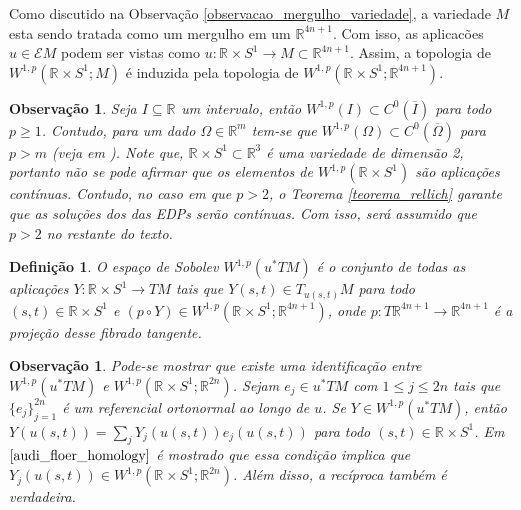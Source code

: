 \documentclass[12pt]{book}
\newtheorem{definicao}[teorema]{Definição}
\newtheorem{observacao}[teorema]{Observação}
\newcommand{\circulo}{S^{1}}
\newcommand{\energiafinitaM}{\mathcal{E}M}
\newcommand{\espacosobolev}[1]{W^{1,p}(#1)}
\newcommand{\espacosobolevcontradominio}[2]{W^{1,p}(#1;#2)}
\newcommand{\espacotangenteponto}[2]{T_{#1}#2}
\newcommand{\pullbackfibradotangente}[2]{#1^{*}T#2}
\newcommand{\pullbackfibradotangenteM}[1]{\pullbackfibradotangente{#1}{M}}
\newcommand{\retacartesianocirculo}{\real{} \times \circulo}
\newcommand{\real}[1]{\mathbb{R}^{#1}}
\newcommand{\reta}{\real{}}
\begin{document}
	Como discutido na Observação \ref{observacao_mergulho_variedade}, a variedade $M$ esta sendo tratada como um mergulho em um $\real{4n+1}$. Com isso, as aplicacões $u \in \energiafinitaM$ podem ser vistas como $u:\retacartesianocirculo\to M \subset \real{4n+1}$. Assim, a topologia de $\espacosobolevcontradominio{\retacartesianocirculo}{M}$ é induzida pela topologia de $\espacosobolevcontradominio{\retacartesianocirculo}{\real{4n+1}}$. 
	
	\begin{observacao}
		Seja $I\subseteq \reta$ um intervalo, então $\espacosobolev{I} \subset C^{0}(\overline{I})$ para todo $p\geq 1$. Contudo, para um dado $\Omega \in \real{m}$ tem-se que $\espacosobolev{\Omega} \subset C^{0}(\overline{\Omega})$ para $p>m$ (veja em \cite{audi_floer_homology}). Note que, $\retacartesianocirculo \subset \real{3}$ é uma variedade de dimensão 2, portanto não se pode afirmar que os elementos de $\espacosobolev{\retacartesianocirculo}$ são aplicações contínuas. Contudo, no caso em que $p>2$, o Teorema \ref{teorema_rellich} garante que as soluções dos das EDPs serão contínuas. Com isso, será assumido que $p>2$ no restante do texto. 
	\end{observacao}
	
	\begin{definicao}
		O espaço de Sobolev $\espacosobolev{\pullbackfibradotangenteM{u}} $ é o conjunto de todas as aplicações $Y:\retacartesianocirculo\to TM$ tais que $Y(s,t) \in \espacotangenteponto{u(s,t)}{M}$ para todo $(s,t) \in \retacartesianocirculo$ e $(p\circ Y) \in \espacosobolevcontradominio{\retacartesianocirculo}{\real{4n+1}}$, onde $p:T\real{4n+1} \to \real{4n+1}$ é a projeção desse fibrado tangente. 
	\end{definicao}
	
	\begin{observacao}\label{observacao_identificacao_espaco_sobolev}
		Pode-se mostrar que existe uma identificação entre  $\espacosobolev{\pullbackfibradotangenteM{u}}$ e $\espacosobolevcontradominio{\retacartesianocirculo}{\real{2n}}$. Sejam $e_{j} \in \pullbackfibradotangenteM{u}$ com $1\leq j\leq 2n$ tais que $\{e_{j} \}_{j=1}^{2n}$ é um referencial ortonormal ao longo de $u$. Se $Y \in \espacosobolev{\pullbackfibradotangenteM{u}}$, então $Y(u(s,t)) = \sum_{j} Y_{j}(u(s,t))e_{j}(u(s,t))$ para todo $(s,t) \in \retacartesianocirculo$. Em $\cite{audi_floer_homology}$ é mostrado que essa condição implica que $Y_{j}(u(s,t)) \in \espacosobolevcontradominio{\retacartesianocirculo}{\real{2n}}$. Além disso, a recíproca também é verdadeira.
	\end{observacao}
	
\end{document}
